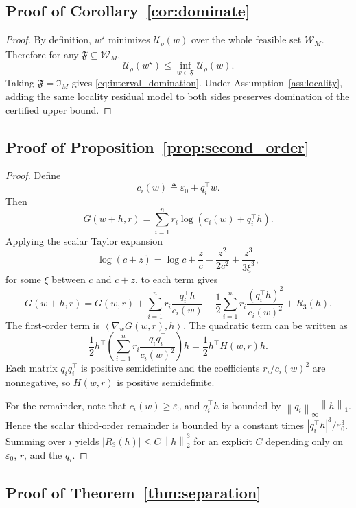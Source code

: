 \documentclass{article}
\newcommand{\cW}{\mathcal{W}}
\newcommand{\norm}[1]{\left\lVert #1 \right\rVert}
\newcommand{\inner}[2]{\left\langle #1, #2 \right\rangle}
\newcommand{\eps}{\varepsilon}
\begin{document}
\subsection{Proof of Corollary~\ref{cor:dominate}}

\begin{proof}
By definition, \(w^\star\) minimizes \(\mathcal{U}_\rho(w)\) over the whole feasible set \(\cW_M\). Therefore for any \(\mathfrak{F}\subseteq\cW_M\),
\[
    \mathcal{U}_\rho(w^\star)
    \le
    \inf_{w\in\mathfrak{F}} \mathcal{U}_\rho(w).
\]
Taking \(\mathfrak{F}=\mathfrak{I}_M\) gives \eqref{eq:interval_domination}. Under Assumption~\ref{ass:locality}, adding the same locality residual model to both sides preserves domination of the certified upper bound.
\end{proof}

\subsection{Proof of Proposition~\ref{prop:second_order}}

\begin{proof}
Define
\[
    c_i(w) \triangleq \eps_0 + q_i^\top w.
\]
Then
\[
    G(w+h,r)
    =
    \sum_{i=1}^{n} r_i \log(c_i(w) + q_i^\top h).
\]
Applying the scalar Taylor expansion
\[
    \log(c+z)
    =
    \log c + \frac{z}{c} - \frac{z^2}{2c^2} + \frac{z^3}{3\xi^3},
\]
for some \(\xi\) between \(c\) and \(c+z\), to each term gives
\[
    G(w+h,r)
    =
    G(w,r)
    +
    \sum_{i=1}^{n} r_i \frac{q_i^\top h}{c_i(w)}
    -
    \frac{1}{2}
    \sum_{i=1}^{n} r_i \frac{(q_i^\top h)^2}{c_i(w)^2}
    +
    R_3(h).
\]
The first-order term is \(\inner{\nabla_w G(w,r)}{h}\). The quadratic term can be written as
\[
    \frac{1}{2}
    h^\top
    \left(
        \sum_{i=1}^{n}
        r_i \frac{q_i q_i^\top}{c_i(w)^2}
    \right)
    h
    =
    \frac{1}{2} h^\top H(w,r) h.
\]
Each matrix \(q_i q_i^\top\) is positive semidefinite and the coefficients \(r_i/c_i(w)^2\) are nonnegative, so \(H(w,r)\) is positive semidefinite.

For the remainder, note that \(c_i(w)\ge \eps_0\) and \(q_i^\top h\) is bounded by \(\norm{q_i}_\infty \norm{h}_1\). Hence the scalar third-order remainder is bounded by a constant times \(|q_i^\top h|^3/\eps_0^3\). Summing over \(i\) yields \(|R_3(h)|\le C\norm{h}_2^3\) for an explicit \(C\) depending only on \(\eps_0\), \(r\), and the \(q_i\).
\end{proof}

\subsection{Proof of Theorem~\ref{thm:separation}}
\end{document}
